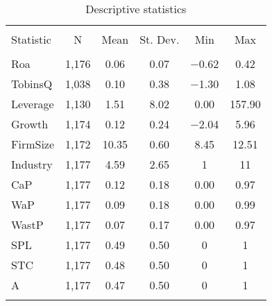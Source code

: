\documentclass[]{article}
\begin{document}
\begin{table}[b] \centering 
  \caption{Descriptive statistics} 
  \label{DescriptiveStatistics} 
\begin{tabular}{@{\extracolsep{5pt}}lccccc} 
\\[-1.8ex]\hline 
\hline \\[-1.8ex] 
Statistic & \multicolumn{1}{c}{N} & \multicolumn{1}{c}{Mean} & \multicolumn{1}{c}{St. Dev.} & \multicolumn{1}{c}{Min} & \multicolumn{1}{c}{Max} \\ 
\hline \\[-1.8ex] 
Roa & 1,176 & 0.06 & 0.07 & $-$0.62 & 0.42 \\ 
TobinsQ & 1,038 & 0.10 & 0.38 & $-$1.30 & 1.08 \\ 
Leverage & 1,130 & 1.51 & 8.02 & 0.00 & 157.90 \\ 
Growth & 1,174 & 0.12 & 0.24 & $-$2.04 & 5.96 \\ 
FirmSize & 1,172 & 10.35 & 0.60 & 8.45 & 12.51 \\ 
Industry & 1,177 & 4.59 & 2.65 & 1 & 11 \\ 
CaP & 1,177 & 0.12 & 0.18 & 0.00 & 0.97 \\ 
WaP & 1,177 & 0.09 & 0.18 & 0.00 & 0.99 \\ 
WastP & 1,177 & 0.07 & 0.17 & 0.00 & 0.97 \\ 
SPL & 1,177 & 0.49 & 0.50 & 0 & 1 \\ 
STC & 1,177 & 0.48 & 0.50 & 0 & 1 \\ 
A & 1,177 & 0.47 & 0.50 & 0 & 1 \\ 
\hline \\[-1.8ex] 
\end{tabular} 
\end{table}
\end{document}
